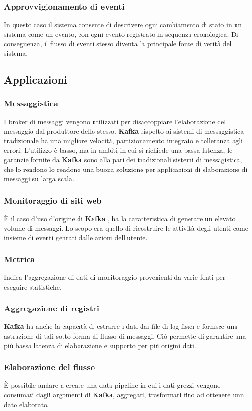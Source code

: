 \documentclass{article}
\begin{document}
\subsubsection{Approvvigionamento di eventi}
In questo caso il sistema consente di descrivere ogni cambiamento di stato in un sistema come un evento, con ogni evento registrato in sequenza cronologica. Di conseguenza, il flusso di eventi stesso diventa la principale fonte di verità del sistema.
\subsection{Applicazioni}
\subsubsection{Messaggistica}
I broker di messaggi vengono utilizzati per disaccoppiare l'elaborazione del messaggio dal produttore dello stesso.
\textbf{Kafka} rispetto ai sistemi di messaggistica tradizionale ha una migliore velocità, partizionamento integrato e tolleranza agli errori.
L'utilizzo è basso, ma in ambiti in cui si richiede una bassa latenza, le garanzie fornite da \textbf{Kafka} sono alla pari dei tradizionali sistemi di messagistica, che lo rendono lo rendono una buona soluzione per applicazioni di elaborazione di messaggi su larga scala.

\subsubsection{Monitoraggio di siti web}
È il caso d'uso d'origine di \textbf{Kafka} , ha la caratteristica di generare un elevato volume di messaggi. Lo scopo era quello di ricostruire le attività degli utenti come insieme di eventi genrati dalle azioni dell'utente.
\subsubsection{Metrica}
Indica l'aggregazione di dati di monitoraggio provenienti da varie fonti per eseguire statistiche.
\subsubsection{Aggregazione di registri}
\textbf{Kafka} ha anche la capacità di estrarre i dati dai file di log fisici e fornisce una astrazione di tali sotto forma di flusso di messaggi. Ciò permette di garantire una più bassa latenza di elaborazione e supporto per più origini dati.
\subsubsection{Elaborazione del flusso}
È possibile andare a creare una  data-pipeline in cui i dati grezzi vengono consumati dagli argomenti di \textbf{Kafka}, aggregati, trasformati fino ad ottenere unn dato elaborato.
\end{document}
